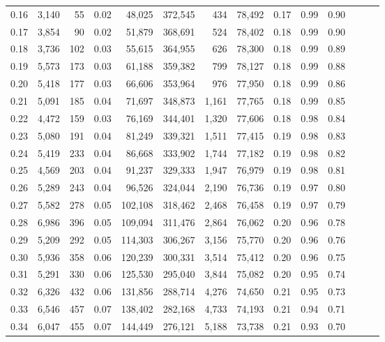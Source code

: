 \begin{tabular}{rrrrrrrrrrrrrr}
0.16 &  3,140 &     55 &  0.02 &   48,025 &  372,545 &     434 &  78,492 &  0.17 &  0.99 &      0.90 \\
0.17 &  3,854 &     90 &  0.02 &   51,879 &  368,691 &     524 &  78,402 &  0.18 &  0.99 &      0.90 \\
0.18 &  3,736 &    102 &  0.03 &   55,615 &  364,955 &     626 &  78,300 &  0.18 &  0.99 &      0.89 \\
0.19 &  5,573 &    173 &  0.03 &   61,188 &  359,382 &     799 &  78,127 &  0.18 &  0.99 &      0.88 \\
0.20 &  5,418 &    177 &  0.03 &   66,606 &  353,964 &     976 &  77,950 &  0.18 &  0.99 &      0.86 \\
0.21 &  5,091 &    185 &  0.04 &   71,697 &  348,873 &   1,161 &  77,765 &  0.18 &  0.99 &      0.85 \\
0.22 &  4,472 &    159 &  0.03 &   76,169 &  344,401 &   1,320 &  77,606 &  0.18 &  0.98 &      0.84 \\
0.23 &  5,080 &    191 &  0.04 &   81,249 &  339,321 &   1,511 &  77,415 &  0.19 &  0.98 &      0.83 \\
0.24 &  5,419 &    233 &  0.04 &   86,668 &  333,902 &   1,744 &  77,182 &  0.19 &  0.98 &      0.82 \\
0.25 &  4,569 &    203 &  0.04 &   91,237 &  329,333 &   1,947 &  76,979 &  0.19 &  0.98 &      0.81 \\
0.26 &  5,289 &    243 &  0.04 &   96,526 &  324,044 &   2,190 &  76,736 &  0.19 &  0.97 &      0.80 \\
0.27 &  5,582 &    278 &  0.05 &  102,108 &  318,462 &   2,468 &  76,458 &  0.19 &  0.97 &      0.79 \\
0.28 &  6,986 &    396 &  0.05 &  109,094 &  311,476 &   2,864 &  76,062 &  0.20 &  0.96 &      0.78 \\
0.29 &  5,209 &    292 &  0.05 &  114,303 &  306,267 &   3,156 &  75,770 &  0.20 &  0.96 &      0.76 \\
0.30 &  5,936 &    358 &  0.06 &  120,239 &  300,331 &   3,514 &  75,412 &  0.20 &  0.96 &      0.75 \\
0.31 &  5,291 &    330 &  0.06 &  125,530 &  295,040 &   3,844 &  75,082 &  0.20 &  0.95 &      0.74 \\
0.32 &  6,326 &    432 &  0.06 &  131,856 &  288,714 &   4,276 &  74,650 &  0.21 &  0.95 &      0.73 \\
0.33 &  6,546 &    457 &  0.07 &  138,402 &  282,168 &   4,733 &  74,193 &  0.21 &  0.94 &      0.71 \\
0.34 &  6,047 &    455 &  0.07 &  144,449 &  276,121 &   5,188 &  73,738 &  0.21 &  0.93 &      0.70 \\

\end{tabular}
